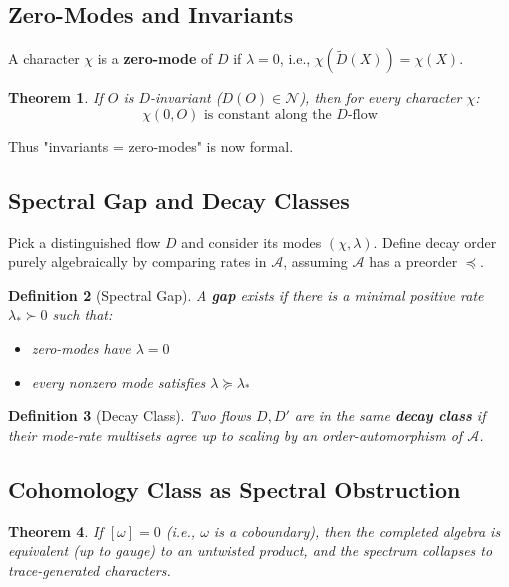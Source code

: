 \documentclass[12pt, oneside]{article}
\newtheorem{theorem}{Theorem}[section]
\newtheorem{definition}[theorem]{Definition}
\newcommand{\N}{\mathcal{N}}
\newcommand{\A}{\mathcal{A}}
\begin{document}
\subsection{Zero-Modes and Invariants}

A character $\chi$ is a \textbf{zero-mode} of $D$ if $\lambda = 0$, i.e., $\chi(\widetilde{D}(X)) = \chi(X)$.

\begin{theorem}
If $O$ is $D$-invariant ($D(O) \in \N$), then for every character $\chi$:
\begin{equation}
\chi(0, O) \text{ is constant along the $D$-flow}
\end{equation}
\end{theorem}

Thus "invariants = zero-modes" is now formal.

\subsection{Spectral Gap and Decay Classes}

Pick a distinguished flow $D$ and consider its modes $(\chi, \lambda)$. Define decay order purely algebraically by comparing rates in $\A$, assuming $\A$ has a preorder $\preceq$.

\begin{definition}[Spectral Gap]
A \textbf{gap} exists if there is a minimal positive rate $\lambda_* \succ 0$ such that:
\begin{itemize}
    \item zero-modes have $\lambda = 0$
    \item every nonzero mode satisfies $\lambda \succeq \lambda_*$
\end{itemize}
\end{definition}

\begin{definition}[Decay Class]
Two flows $D, D'$ are in the same \textbf{decay class} if their mode-rate multisets agree up to scaling by an order-automorphism of $\A$.
\end{definition}

\subsection{Cohomology Class as Spectral Obstruction}

\begin{theorem}
If $[\omega] = 0$ (i.e., $\omega$ is a coboundary), then the completed algebra is equivalent (up to gauge) to an untwisted product, and the spectrum collapses to trace-generated characters.
\end{theorem}
\end{document}
